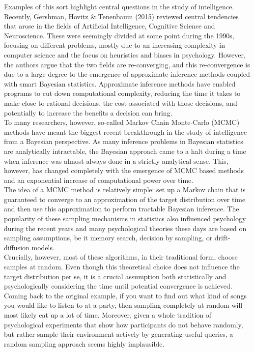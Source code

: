 \documentclass[oneside, 11pt]{book}
\begin{document}
Examples of this sort highlight central questions in the study of intelligence. Recently, Gershman, Hovitz \& Tenenbaum (2015) reviewed central tendencies that arose in the fields of Artificial Intelligence, Cognitive Science and Neuroscience. These were seemingly divided at some point during the 1990s, focusing on different problems, mostly due to an increasing complexity in computer science and the focus on heuristics and biases in psychology. However, the authors argue that the two fields are re-converging, and this re-convergence is due to a large degree to the emergence of approximate inference methods coupled with smart Bayesian statistics. Approximate inference methods have enabled programs to cut down computational complexity, reducing the time it takes to make close to rational decisions, the cost associated with those decisions, and potentially to increase the benefits a decision can bring. \\
To many researchers, however, so-called Markov Chain Monte-Carlo (MCMC) methods have meant the biggest recent breakthrough in the study of intelligence from a Bayesian perspective. As many inference problems in Bayesian statistics are analytically intractable, the Bayesian approach came to a halt during a time when inference was almost always done in a strictly analytical sense. This, however, has changed completely with the emergence of MCMC based methods and an exponential increase of computational power over time. \\
The idea of a MCMC method is relatively simple: set up a Markov chain that is guaranteed to converge to an approximation of the target distribution over time and then use this approximation to perform tractable Bayesian inference. The popularity of these sampling mechanisms in statistics also influenced psychology during the recent years and many psychological theories these days are based on sampling assumptions, be it memory search, decision by sampling, or drift-diffusion models.\\
Crucially, however, most of these algorithms, in their traditional form, choose samples at random. Even though this theoretical choice does not influence the target distribution per se, it is a crucial assumption both statistically and psychologically considering the time until potential convergence is achieved. Coming back to the original example, if you want to find out what kind of songs you would like to listen to at a party, then sampling completely at random will most likely eat up a lot of time. Moreover, given a whole tradition of psychological experiments that show how participants do not behave randomly, but rather sample their environment actively by generating useful queries, a random sampling approach seems highly implausible.\\
\end{document}
